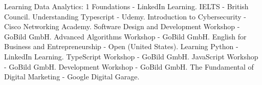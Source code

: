 

\begin{scholarship}
					{Learning Data Analytics: 1 Foundations  - LinkedIn Learning. }
					{IELTS  - British Council.  }
					{Understanding Typescript  - Udemy. }
					{Introduction to Cybersecurity  - Cisco Networking Academy. }
					{Software Design and Development Workshop  -  GoBild GmbH. }
					{Advanced Algorithms Workshop    - GoBild GmbH. }
					{English for Business and Entrepreneurship  - Open (United States).}
					{Learning Python  - LinkedIn Learning. }
					{TypeScript Workshop    - GoBild GmbH. }
					{JavaScript Workshop    - GoBild GmbH. }
					{Development Workshop    - GoBild GmbH. }
					{The Fundamental of Digital Marketing   - Google Digital Garage. }
\emptySeparator

\end{scholarship}